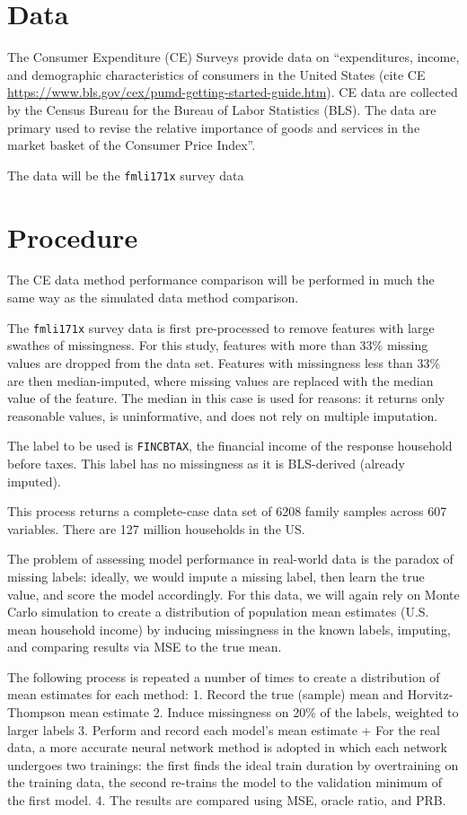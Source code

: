 \documentclass[12pt,twoside]{reedthesis}
\begin{document}
\section{Data}\label{data}

The Consumer Expenditure (CE) Surveys provide data on ``expenditures,
income, and demographic characteristics of consumers in the United
States (cite CE
\url{https://www.bls.gov/cex/pumd-getting-started-guide.htm}). CE data
are collected by the Census Bureau for the Bureau of Labor Statistics
(BLS). The data are primary used to revise the relative importance of
goods and services in the market basket of the Consumer Price Index''.

The data will be the \texttt{fmli171x} survey data

\section{Procedure}\label{procedure}

The CE data method performance comparison will be performed in much the
same way as the simulated data method comparison.

The \texttt{fmli171x} survey data is first pre-processed to remove
features with large swathes of missingness. For this study, features
with more than 33\% missing values are dropped from the data set.
Features with missingness less than 33\% are then median-imputed, where
missing values are replaced with the median value of the feature. The
median in this case is used for reasons: it returns only reasonable
values, is uninformative, and does not rely on multiple imputation.

The label to be used is \texttt{FINCBTAX}, the financial income of the
response household before taxes. This label has no missingness as it is
BLS-derived (already imputed).

This process returns a complete-case data set of 6208 family samples
across 607 variables. There are 127 million households in the US.

The problem of assessing model performance in real-world data is the
paradox of missing labels: ideally, we would impute a missing label,
then learn the true value, and score the model accordingly. For this
data, we will again rely on Monte Carlo simulation to create a
distribution of population mean estimates (U.S. mean household income)
by inducing missingness in the known labels, imputing, and comparing
results via MSE to the true mean.

The following process is repeated a number of times to create a
distribution of mean estimates for each method: 1. Record the true
(sample) mean and Horvitz-Thompson mean estimate 2. Induce missingness
on 20\% of the labels, weighted to larger labels 3. Perform and record
each model's mean estimate + For the real data, a more accurate neural
network method is adopted in which each network undergoes two trainings:
the first finds the ideal train duration by overtraining on the training
data, the second re-trains the model to the validation minimum of the
first model. 4. The results are compared using MSE, oracle ratio, and
PRB.
\end{document}
